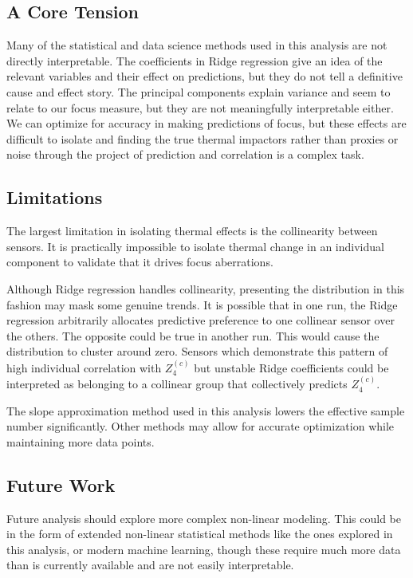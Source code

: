 \documentclass[SE,authoryear,toc]{lsstdoc}
\begin{document}
\subsection{A Core Tension}
\label{subsec: Tension}
Many of the statistical and data science methods used in this analysis are not directly interpretable. The coefficients in Ridge regression give an idea of the relevant variables and their effect on predictions, but they do not tell a definitive cause and effect story. The principal components explain variance and seem to relate to our focus measure, but they are not meaningfully interpretable either. We can optimize for accuracy in making predictions of focus, but these effects are difficult to isolate and finding the true thermal impactors rather than proxies or noise through the project of prediction and correlation is a complex task. 


\subsection{Limitations}

The largest limitation in isolating thermal effects is the collinearity between sensors. It is practically impossible to isolate thermal change in an individual component to validate that it drives focus aberrations. 

Although Ridge regression handles collinearity, presenting the distribution in this fashion may mask some genuine trends. It is possible that in one run, the Ridge regression arbitrarily allocates predictive preference to one collinear sensor over the others. The opposite could be true in another run. This would cause the distribution to cluster around zero. Sensors which demonstrate this pattern of high individual correlation with $Z_4^{(c)}$ but unstable Ridge coefficients could be interpreted as belonging to a collinear group that collectively predicts $Z_4^{(c)}$.

The slope approximation method used in this analysis lowers the effective sample number significantly. Other methods may allow for accurate optimization while maintaining more data points. 

\subsection{Future Work}

Future analysis should explore more complex non-linear modeling. This could be in the form of extended non-linear statistical methods like the ones explored in this analysis, or modern machine learning, though these require much more data than is currently available and are not easily interpretable. 
\end{document}
